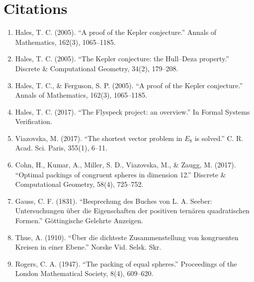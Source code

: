 \section{Citations}

\begin{enumerate}
\item Hales, T. C. (2005). ``A proof of the Kepler conjecture.'' Annals of Mathematics, 162(3), 1065--1185.
\item Hales, T. C. (2005). ``The Kepler conjecture: the Hull--Deza property.'' Discrete \& Computational Geometry, 34(2), 179--208.
\item Hales, T. C., \& Ferguson, S. P. (2005). ``A proof of the Kepler conjecture.'' Annals of Mathematics, 162(3), 1065--1185.
\item Hales, T. C. (2017). ``The Flyspeck project: an overview.'' In Formal Systems Verification.
\item Viazovska, M. (2017). ``The shortest vector problem in $E_8$ is solved.'' C. R. Acad. Sci. Paris, 355(1), 6--11.
\item Cohn, H., Kumar, A., Miller, S. D., Viazovska, M., \& Zaugg, M. (2017). ``Optimal packings of congruent spheres in dimension 12.'' Discrete \& Computational Geometry, 58(4), 725--752.
\item Gauss, C. F. (1831). ``Besprechung des Buches von L. A. Seeber: Untersuchungen über die Eigenschaften der positiven ternären quadratischen Formen.'' Göttingische Gelehrte Anzeigen.
\item Thue, A. (1910). ``Über die dichteste Zusammenstellung von kongruenten Kreisen in einer Ebene.'' Norske Vid. Selsk. Skr.
\item Rogers, C. A. (1947). ``The packing of equal spheres.'' Proceedings of the London Mathematical Society, 8(4), 609--620.
\end{enumerate}
